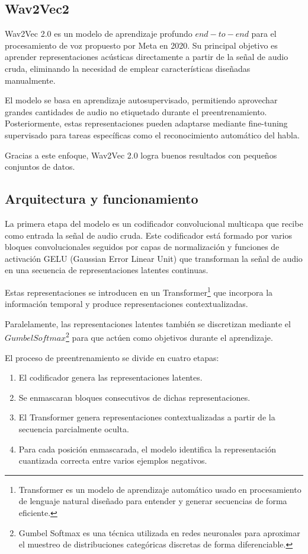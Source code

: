 \subsection{Wav2Vec2}
\label{subsubsec:eda_wav2vec}
Wav2Vec 2.0 es un modelo de aprendizaje profundo $end-to-end$ para el procesamiento de voz propuesto por Meta en 2020. Su principal objetivo es aprender representaciones acústicas directamente a partir de la señal de audio cruda, eliminando la necesidad de emplear características diseñadas manualmente.

El modelo se basa en aprendizaje autosupervisado, permitiendo aprovechar grandes cantidades de audio no etiquetado durante el preentrenamiento. Posteriormente, estas representaciones pueden adaptarse mediante fine-tuning supervisado para tareas específicas como el reconocimiento automático del habla.

Gracias a este enfoque, Wav2Vec 2.0 logra buenos resultados con pequeños conjuntos de datos.

\subsection*{Arquitectura y funcionamiento}

La primera etapa del modelo es un codificador convolucional multicapa que recibe como entrada la señal de audio cruda. Este codificador está formado por varios bloques convolucionales seguidos por capas de normalización y funciones de activación GELU (Gaussian Error Linear Unit) que transforman la señal de audio en una secuencia de representaciones latentes continuas.

Estas representaciones se introducen en un Transformer\footnote{Transformer es un modelo de aprendizaje automático usado en procesamiento de lenguaje natural diseñado para entender y generar secuencias de forma eficiente.} que incorpora la información temporal y produce representaciones contextualizadas.

Paralelamente, las representaciones latentes también se discretizan mediante el $Gumbel Softmax$\footnote{Gumbel Softmax es una técnica utilizada en redes neuronales para aproximar el muestreo de distribuciones categóricas discretas de forma diferenciable.} para que actúen como objetivos durante el aprendizaje.

El proceso de preentrenamiento se divide en cuatro etapas:

\begin{enumerate}
	\item El codificador genera las representaciones latentes.
	\item Se enmascaran bloques consecutivos de dichas representaciones.
	\item El Transformer genera representaciones contextualizadas a partir de la secuencia parcialmente oculta.
	\item Para cada posición enmascarada, el modelo identifica la representación cuantizada correcta entre varios ejemplos negativos.
\end{enumerate}

